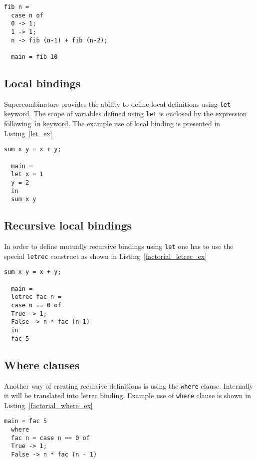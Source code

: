 \documentclass[a4paper]{report}
\begin{document}
\begin{lstlisting}[label=case_ex,caption={Fibonacci with case}]
  fib n =
  case n of
  0 -> 1;
  1 -> 1;
  n -> fib (n-1) + fib (n-2);

  main = fib 10
\end{lstlisting}

\subsection{Local bindings}
Supercombinators provides the ability to define local definitions using
\texttt{let} keyword. The scope of variables defined using \texttt{let} is
enclosed by the expression following \texttt{in} keyword. The example use of
local binding is presented in Listing~\ref{let_ex}


\begin{lstlisting}[label=let_ex,caption={Local \texttt{let} binding.}]
  sum x y = x + y;

  main =
  let x = 1
  y = 2
  in
  sum x y
\end{lstlisting}

\subsection{Recursive local bindings}
In order to define mutually recursive bindings using \texttt{let} one has to use the
special \texttt{letrec} construct as shown in Listing~\ref{factorial_letrec_ex}


\begin{lstlisting}[label=factorial_letrec_ex,caption={Factorial function using \texttt{letrec}.}]
  sum x y = x + y;

  main =
  letrec fac n =
  case n == 0 of
  True -> 1;
  False -> n * fac (n-1)
  in
  fac 5
\end{lstlisting}

\subsection{Where clauses}
Another way of creating recursive definitions is using the \texttt{where}
clause. Internally it will be translated into letrec binding. Example use of
\texttt{where} clause is shown in Listing~\ref{factorial_where_ex}

\begin{lstlisting}[label=factorial_where_ex,caption={Factorial function using \texttt{where}.}]
  main = fac 5
  where
  fac n = case n == 0 of
  True -> 1;
  False -> n * fac (n - 1)
\end{lstlisting}
\end{document}
